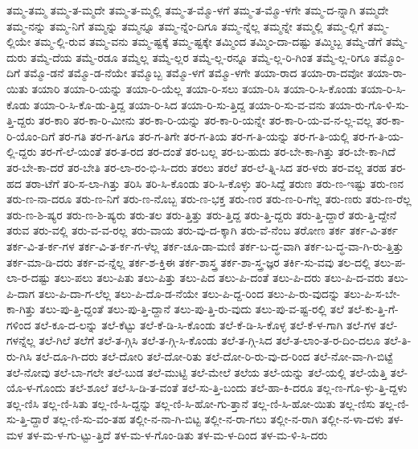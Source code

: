 {ತಮ್ಮ-ತಮ್ಮ
ತಮ್ಮ-ತ-ಮ್ಮದೇ
ತಮ್ಮ-ತ-ಮ್ಮಲ್ಲಿ
ತಮ್ಮ-ತ-ಮ್ಮೊ-ಳಗೆ
ತಮ್ಮ-ತ-ಮ್ಮೊ-ಳಗೇ
ತಮ್ಮ-ದ-ನ್ನಾಗಿ
ತಮ್ಮದೇ
ತಮ್ಮ-ನನ್ನು
ತಮ್ಮ-ನಿಗೆ
ತಮ್ಮನ್ನು
ತಮ್ಮನ್ನೂ
ತಮ್ಮ-ನ್ನೆಂ-ದಿಗೂ
ತಮ್ಮ-ನ್ನೆಲ್ಲ
ತಮ್ಮನ್ನೇ
ತಮ್ಮಲ್ಲಿ
ತಮ್ಮ-ಲ್ಲಿಗೆ
ತಮ್ಮ-ಲ್ಲಿಯೇ
ತಮ್ಮ-ಲ್ಲಿ-ರುವ
ತಮ್ಮ-ವನು
ತಮ್ಮ-ಷ್ಟಕ್ಕೆ
ತಮ್ಮ-ಷ್ಟಕ್ಕೇ
ತಮ್ಮಿಂದ
ತಮ್ಮಿಂ-ದಾ-ದಷ್ಟು
ತಮ್ಮಿಬ್ಬ
ತಮ್ಮೆ-ಡೆಗೆ
ತಮ್ಮೆ-ದುರು
ತಮ್ಮೆ-ದೆಯ
ತಮ್ಮೆ-ರಡೂ
ತಮ್ಮೆಲ್ಲ
ತಮ್ಮೆ-ಲ್ಲರ
ತಮ್ಮೆ-ಲ್ಲ-ರನ್ನೂ
ತಮ್ಮೆ-ಲ್ಲ-ರಿ-ಗಿಂತ
ತಮ್ಮೆ-ಲ್ಲ-ರಿಗೂ
ತಮ್ಮೊಂ-ದಿಗೆ
ತಮ್ಮೊ-ಡನೆ
ತಮ್ಮೊ-ಡ-ನೆಯೇ
ತಮ್ಮೊಬ್ಬ
ತಮ್ಮೊ-ಳಗೆ
ತಮ್ಮೊ-ಳಗೇ
ತಯಾ-ರಾದ
ತಯಾ-ರಾ-ದವೋ
ತಯಾ-ರಾ-ಯಿತು
ತಯಾರಿ
ತಯಾ-ರಿ-ಯನ್ನು
ತಯಾ-ರಿ-ಯೆಲ್ಲ
ತಯಾ-ರಿ-ಸಲು
ತಯಾ-ರಿಸಿ
ತಯಾ-ರಿ-ಸಿ-ಕೊಂಡು
ತಯಾ-ರಿ-ಸಿ-ಕೊಡು
ತಯಾ-ರಿ-ಸಿ-ಕೊ-ಡು-ತ್ತಿದ್ದ
ತಯಾ-ರಿ-ಸಿದ
ತಯಾ-ರಿ-ಸು-ತ್ತಿದ್ದ
ತಯಾ-ರಿ-ಸು-ವ-ವನು
ತಯಾ-ರು-ಗೊ-ಳಿ-ಸು-ತ್ತಿ-ದ್ದರು
ತರ-ಕಾರಿ
ತರ-ಕಾ-ರಿ-ಮೀನು
ತರ-ಕಾ-ರಿ-ಯನ್ನು
ತರ-ಕಾ-ರಿ-ಯನ್ನೇ
ತರ-ಕಾ-ರಿ-ಯ-ವ-ನ-ಲ್ಲ-ವಲ್ಲ
ತರ-ಕಾ-ರಿ-ಯೊಂ-ದಿಗೆ
ತರ-ಗತಿ
ತರ-ಗ-ತಿಗೂ
ತರ-ಗ-ತಿಗೇ
ತರ-ಗ-ತಿಯ
ತರ-ಗ-ತಿ-ಯನ್ನು
ತರ-ಗ-ತಿ-ಯಲ್ಲಿ
ತರ-ಗ-ತಿ-ಯ-ಲ್ಲಿ-ದ್ದರು
ತರ-ಗೆ-ಲೆ-ಯಂತೆ
ತರ-ತ-ರದ
ತರ-ದಂತೆ
ತರ-ಬಲ್ಲ
ತರ-ಬ-ಹುದು
ತರ-ಬೇ-ಕಾ-ಗಿತ್ತು
ತರ-ಬೇ-ಕಾ-ಗಿದೆ
ತರ-ಬೇ-ಕಾ-ದರೆ
ತರ-ಬೇತಿ
ತರ-ಲಾ-ರಂ-ಭಿ-ಸಿ-ದರು
ತರಲು
ತರಲೆ
ತರ-ಲೆ-ತ್ನಿ-ಸಿದ
ತರ-ಳರು
ತರ-ವಲ್ಲ
ತರಹ
ತರ-ಹದ
ತರಾ-ಟೆಗೆ
ತರಿ-ಸ-ಲಾ-ಗಿತ್ತು
ತರಿಸಿ
ತರಿ-ಸಿ-ಕೊಂಡು
ತರಿ-ಸಿ-ಕೊಳ್ಳು
ತರಿ-ಸಿದ್ದೆ
ತರುಣ
ತರು-ಣ-ಇಷ್ಟು
ತರು-ಣನ
ತರು-ಣ-ನಾ-ದರೂ
ತರು-ಣ-ನಿಗೆ
ತರು-ಣ-ನೊಬ್ಬ
ತರು-ಣ-ಭಕ್ತ
ತರು-ಣರ
ತರು-ಣ-ರಿ-ಗೆಲ್ಲ
ತರು-ಣರು
ತರು-ಣ-ರೆಲ್ಲ
ತರು-ಣ-ಶಿ-ಷ್ಯರ
ತರು-ಣ-ಶಿ-ಷ್ಯರು
ತರು-ತಲ
ತರು-ತ್ತಿತ್ತು
ತರು-ತ್ತಿದ್ದ
ತರು-ತ್ತಿ-ದ್ದರು
ತರು-ತ್ತಿ-ದ್ದಾರೆ
ತರು-ತ್ತಿ-ದ್ದೇನೆ
ತರುವ
ತರು-ವಲ್ಲಿ
ತರು-ವ-ವ-ರಲ್ಲ
ತರು-ವಾಯ
ತರು-ವು-ದ-ಕ್ಕಾಗಿ
ತರು-ವೆ-ನೆಂಬ
ತರೋಣ
ತರ್ಕ
ತರ್ಕ-ವಿ-ತರ್ಕ
ತರ್ಕ-ವಿ-ತ-ರ್ಕ-ಗಳ
ತರ್ಕ-ವಿ-ತ-ರ್ಕ-ಗ-ಳೆಲ್ಲ
ತರ್ಕ-ಚೂ-ಡಾ-ಮಣಿ
ತರ್ಕ-ಬ-ದ್ಧ-ವಾಗಿ
ತರ್ಕ-ಬ-ದ್ಧ-ವಾ-ಗಿ-ರು-ತ್ತಿತ್ತು
ತರ್ಕ-ಮಾ-ಡಿ-ದರು
ತರ್ಕ-ವ-ನ್ನೆಲ್ಲ
ತರ್ಕ-ಶ-ಕ್ತಿಈ
ತರ್ಕ-ಶಾಸ್ತ್ರ
ತರ್ಕ-ಶಾ-ಸ್ತ್ರ-ಜ್ಞರ
ತರ್ಕಿ-ಸು-ವವು
ತಲ-ದಲ್ಲಿ
ತಲು-ಪ-ಲಾ-ರ-ದಷ್ಟು
ತಲು-ಪಲು
ತಲು-ಪಿತು
ತಲು-ಪಿತ್ತು
ತಲು-ಪಿದ
ತಲು-ಪಿ-ದಂತೆ
ತಲು-ಪಿ-ದರು
ತಲು-ಪಿ-ದ-ವರು
ತಲು-ಪಿ-ದಾಗ
ತಲು-ಪಿ-ದಾ-ಗ-ಲೆಲ್ಲ
ತಲು-ಪಿ-ದೊ-ಡ-ನೆಯೇ
ತಲು-ಪಿ-ದ್ದ-ರಿಂದ
ತಲು-ಪಿ-ರು-ವುದನ್ನು
ತಲು-ಪಿ-ಸ-ಬೇ-ಕಾ-ಗಿತ್ತು
ತಲು-ಪು-ತ್ತಿ-ದ್ದಂತೆ
ತಲು-ಪು-ತ್ತಿ-ದ್ದಾನೆ
ತಲು-ಪು-ತ್ತಿ-ರು-ವುದು
ತಲು-ಪು-ವ-ಷ್ಟ-ರಲ್ಲಿ
ತಲೆ
ತಲೆ-ಕು-ತ್ತಿ-ಗೆ-ಗಳಿಂದ
ತಲೆ-ಕೂ-ದ-ಲನ್ನು
ತಲೆ-ಕೆಟ್ಟು
ತಲೆ-ಕೆ-ಡಿ-ಸಿ-ಕೊಂಡು
ತಲೆ-ಕೆ-ಡಿ-ಸಿ-ಕೊಳ್ಳ
ತಲೆ-ಕೆ-ಳ-ಗಾಗಿ
ತಲೆ-ಗಳ
ತಲೆ-ಗಳನ್ನೆಲ್ಲ
ತಲೆ-ಗಿಲೆ
ತಲೆಗೆ
ತಲೆ-ತ-ಗ್ಗಿಸಿ
ತಲೆ-ತ-ಗ್ಗಿ-ಸಿ-ಕೊಂಡು
ತಲೆ-ತ-ಗ್ಗಿ-ಸಿದ
ತಲೆ-ತ-ಲಾಂ-ತ-ರ-ದಿಂ-ದಲೂ
ತಲೆ-ತಿ-ರು-ಗಿಸಿ
ತಲೆ-ದೂ-ಗಿ-ದರು
ತಲೆ-ದೋರಿ
ತಲೆ-ದೋ-ರಿತು
ತಲೆ-ದೋ-ರಿ-ರು-ವು-ದ-ರಿಂದ
ತಲೆ-ನೋ-ವಾ-ಗಿ-ಬಿಟ್ಟೆ
ತಲೆ-ನೋವು
ತಲೆ-ಬಾ-ಗಲೇ
ತಲೆ-ಬುಡ
ತಲೆ-ಮುಟ್ಟಿ
ತಲೆ-ಮೇಲೆ
ತಲೆಯ
ತಲೆ-ಯನ್ನು
ತಲೆ-ಯಲ್ಲಿ
ತಲೆ-ಯೆತ್ತಿ
ತಲೆ-ಯೊ-ಳ-ಗೊಂದು
ತಲೆ-ಶೂಲೆ
ತಲೆ-ಸಿ-ಡಿ-ತ-ವಂತೆ
ತಲೆ-ಸು-ತ್ತಿ-ಬಂದು
ತಲೆ-ಹಾ-ಕಿ-ದರೂ
ತಲ್ಲ-ಣ-ಗೊ-ಳ್ಳು-ತ್ತಿ-ದ್ದಳು
ತಲ್ಲ-ಣಿಸಿ
ತಲ್ಲ-ಣಿ-ಸಿತು
ತಲ್ಲ-ಣಿ-ಸಿ-ದ್ದನ್ನು
ತಲ್ಲ-ಣಿ-ಸಿ-ಹೋ-ಗು-ತ್ತಾನೆ
ತಲ್ಲ-ಣಿ-ಸಿ-ಹೋ-ಯಿತು
ತಲ್ಲ-ಣಿಸು
ತಲ್ಲ-ಣಿ-ಸು-ತ್ತಿ-ದ್ದಾರೆ
ತಲ್ಲ-ಣಿ-ಸು-ವಂ-ತಹ
ತಲ್ಲೀ-ನ-ನಾ-ಗಿ-ಬಿಟ್ಟ
ತಲ್ಲೀ-ನ-ರಾ-ಗಲು
ತಲ್ಲೀ-ನ-ರಾಗಿ
ತಲ್ಲೀ-ನ-ಳಾ-ದಳು
ತಳ-ಮಳ
ತಳ-ಮ-ಳ-ಗು-ಟ್ಟು-ತ್ತಿದೆ
ತಳ-ಮ-ಳ-ಗೊಂ-ಡಿತು
ತಳ-ಮ-ಳ-ದಿಂದ
ತಳ-ಮ-ಳಿ-ಸಿ-ದರು
}
